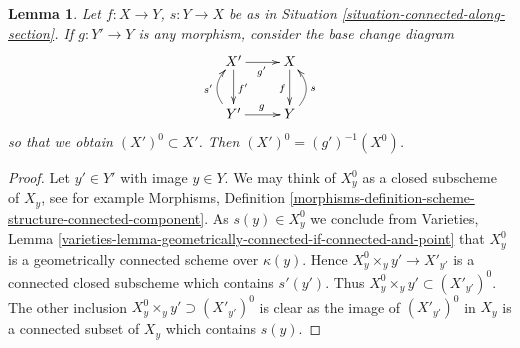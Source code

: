 \documentclass[10pt,a4paper]{amsart}
\theoremstyle{plain}
\newtheorem{lemma}[subsection]{Lemma}
\theoremstyle{definition}
\theoremstyle{remark}
\numberwithin{equation}{subsection}
\begin{document}
\begin{lemma}
\label{lemma-base-change-connected-along-section}
Let $f : X \to Y$, $s : Y \to X$ be as in
Situation \ref{situation-connected-along-section}.
If $g : Y' \to Y$ is any morphism, consider the base change diagram
$$
\xymatrix{
X' \ar[r]_{g'} \ar[d]^{f'} & X \ar[d]_f \\
Y' \ar@/^1pc/[u]^{s'} \ar[r]^g & Y \ar@/_1pc/[u]_s
}
$$
so that we obtain $(X')^0 \subset X'$.
Then $(X')^0 = (g')^{-1}(X^0)$.
\end{lemma}

\begin{proof}
Let $y' \in Y'$ with image $y \in Y$. We may think of
$X^0_y$ as a closed subscheme of $X_y$, see for example
Morphisms,
Definition \ref{morphisms-definition-scheme-structure-connected-component}.
As $s(y) \in X^0_y$ we conclude from
Varieties, Lemma
\ref{varieties-lemma-geometrically-connected-if-connected-and-point}
that $X_y^0$ is a geometrically connected scheme over $\kappa(y)$.
Hence $X_y^0 \times_y y' \to X'_{y'}$ is a connected closed subscheme
which contains $s'(y')$. Thus $X_y^0 \times_y y' \subset (X'_{y'})^0$.
The other inclusion $X_y^0 \times_y y' \supset (X'_{y'})^0$ is clear
as the image of $(X'_{y'})^0$ in $X_y$ is a connected subset of $X_y$ which
contains $s(y)$.
\end{proof}
\end{document}
